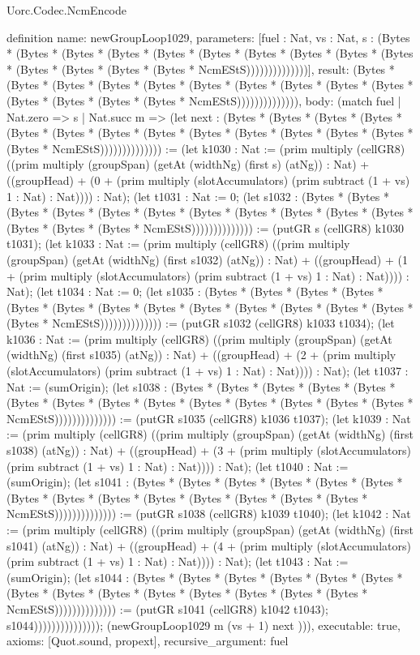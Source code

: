 \begin{lexlean}{Uorc.Codec.NcmEncode}
\begin{semanticmodule}
definition{
  name: newGroupLoop1029,
  parameters: [fuel : Nat, vs : Nat, s : (Bytes * (Bytes * (Bytes * (Bytes * (Bytes * (Bytes * (Bytes * (Bytes * (Bytes * (Bytes * (Bytes * (Bytes * (Bytes * (Bytes * NcmEStS))))))))))))))],
  result: (Bytes * (Bytes * (Bytes * (Bytes * (Bytes * (Bytes * (Bytes * (Bytes * (Bytes * (Bytes * (Bytes * (Bytes * (Bytes * (Bytes * NcmEStS)))))))))))))),
  body: (match fuel
    | Nat.zero => s
    | Nat.succ m => (let next : (Bytes * (Bytes * (Bytes * (Bytes * (Bytes * (Bytes * (Bytes * (Bytes * (Bytes * (Bytes * (Bytes * (Bytes * (Bytes * (Bytes * NcmEStS)))))))))))))) := (let k1030 : Nat := (prim multiply (cellGR8) ((prim multiply (groupSpan) (getAt (widthNg) (first s) (atNg)) : Nat) + ((groupHead) + (0 + (prim multiply (slotAccumulators) (prim subtract (1 + vs) 1 : Nat) : Nat)))) : Nat); (let t1031 : Nat := 0; (let s1032 : (Bytes * (Bytes * (Bytes * (Bytes * (Bytes * (Bytes * (Bytes * (Bytes * (Bytes * (Bytes * (Bytes * (Bytes * (Bytes * (Bytes * NcmEStS)))))))))))))) := (putGR s (cellGR8) k1030 t1031); (let k1033 : Nat := (prim multiply (cellGR8) ((prim multiply (groupSpan) (getAt (widthNg) (first s1032) (atNg)) : Nat) + ((groupHead) + (1 + (prim multiply (slotAccumulators) (prim subtract (1 + vs) 1 : Nat) : Nat)))) : Nat); (let t1034 : Nat := 0; (let s1035 : (Bytes * (Bytes * (Bytes * (Bytes * (Bytes * (Bytes * (Bytes * (Bytes * (Bytes * (Bytes * (Bytes * (Bytes * (Bytes * (Bytes * NcmEStS)))))))))))))) := (putGR s1032 (cellGR8) k1033 t1034); (let k1036 : Nat := (prim multiply (cellGR8) ((prim multiply (groupSpan) (getAt (widthNg) (first s1035) (atNg)) : Nat) + ((groupHead) + (2 + (prim multiply (slotAccumulators) (prim subtract (1 + vs) 1 : Nat) : Nat)))) : Nat); (let t1037 : Nat := (sumOrigin); (let s1038 : (Bytes * (Bytes * (Bytes * (Bytes * (Bytes * (Bytes * (Bytes * (Bytes * (Bytes * (Bytes * (Bytes * (Bytes * (Bytes * (Bytes * NcmEStS)))))))))))))) := (putGR s1035 (cellGR8) k1036 t1037); (let k1039 : Nat := (prim multiply (cellGR8) ((prim multiply (groupSpan) (getAt (widthNg) (first s1038) (atNg)) : Nat) + ((groupHead) + (3 + (prim multiply (slotAccumulators) (prim subtract (1 + vs) 1 : Nat) : Nat)))) : Nat); (let t1040 : Nat := (sumOrigin); (let s1041 : (Bytes * (Bytes * (Bytes * (Bytes * (Bytes * (Bytes * (Bytes * (Bytes * (Bytes * (Bytes * (Bytes * (Bytes * (Bytes * (Bytes * NcmEStS)))))))))))))) := (putGR s1038 (cellGR8) k1039 t1040); (let k1042 : Nat := (prim multiply (cellGR8) ((prim multiply (groupSpan) (getAt (widthNg) (first s1041) (atNg)) : Nat) + ((groupHead) + (4 + (prim multiply (slotAccumulators) (prim subtract (1 + vs) 1 : Nat) : Nat)))) : Nat); (let t1043 : Nat := (sumOrigin); (let s1044 : (Bytes * (Bytes * (Bytes * (Bytes * (Bytes * (Bytes * (Bytes * (Bytes * (Bytes * (Bytes * (Bytes * (Bytes * (Bytes * (Bytes * NcmEStS)))))))))))))) := (putGR s1041 (cellGR8) k1042 t1043); s1044))))))))))))))); (newGroupLoop1029 m (vs + 1) next ))),
  executable: true,
  axioms: [Quot.sound, propext],
  recursive_argument: fuel
}


\end{semanticmodule}
\end{lexlean}
